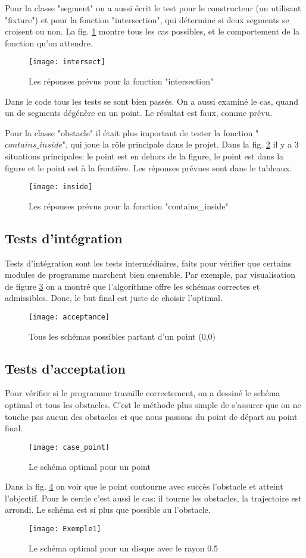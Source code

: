 \documentclass[12pt]{article}
\begin{document}
	Pour la classe "segment" on a aussi écrit le test pour le constructeur (un utilisant "fixture") et pour la fonction "intersection", qui détermine si deux segments se croisent ou non. La fig. \ref{fig:intersection} montre tous les cas possibles, et le comportement de la fonction qu'on attendre.
	\begin{figure}[H]
		\centering
		\texttt{[image: intersect]}
		\caption{Les réponses prévus pour la fonction "intersection"}
		\label{fig:intersection}
	\end{figure}
	Dans le code tous les tests se sont bien passés. On a aussi examiné le cas, quand un de segments dégénère en un point. Le résultat est faux, comme prévu.
	
	
	Pour la classe "obstacle" il était plus important de tester la fonction "$contains\_inside$", qui joue la rôle principale dans le projet. Dans la fig. \ref{inside} il y a 3 situations principales: le point est en dehors de la figure, le point est dans la figure et le point est à la frontière. Les réponses prévues sont dans le tableaux. 
	\begin{figure}[H]
		\centering
		\texttt{[image: inside]}
		\caption{Les réponses prévus pour la fonction "contains\_inside"}
		\label{inside}
	\end{figure}
	\subsection{Tests d'intégration}
	Tests d'intégration sont les tests intermédiaires, faits pour vérifier que certains modules de programme marchent bien ensemble.
	Par exemple, par visualisation de figure \ref{integration} on a montré que l'algorithme offre les schémas correctes et admissibles. Donc, le but final est juste de choisir l'optimal.
		\begin{figure}[H]
		\centering
		\texttt{[image: acceptance]}
		\caption{Tous les schémas possibles partant d'un point (0,0)}
		\label{integration}
	\end{figure}
	\subsection {Tests d'acceptation}	
	Pour vérifier si le programme travaille correctement, on a dessiné le schéma optimal et tous les obstacles. C'est le méthode plus simple de s'assurer que on ne touche pas aucun des obstacles et que nous passons du point de départ au point final. 
	\begin{figure}[H]
		\centering
		\texttt{[image: case\_point]}
		\caption{Le schéma optimal pour un point}
		\label{fig:point}
	\end{figure}
	Dans la fig. \ref{fig:point} on voir que le point contourne avec succès l'obstacle et atteint l'objectif. Pour le cercle c'est aussi le cas: il tourne les obstacles, la trajectoire est arrondi. Le schéma est si plus que possible au l'obstacle.
	\begin{figure}[H]
		\centering
		\texttt{[image: Exemple1]}
		\caption{Le schéma optimal pour un disque avec le rayon 0.5 }
		\label{fig:disk}
	\end{figure}
\end{document}
